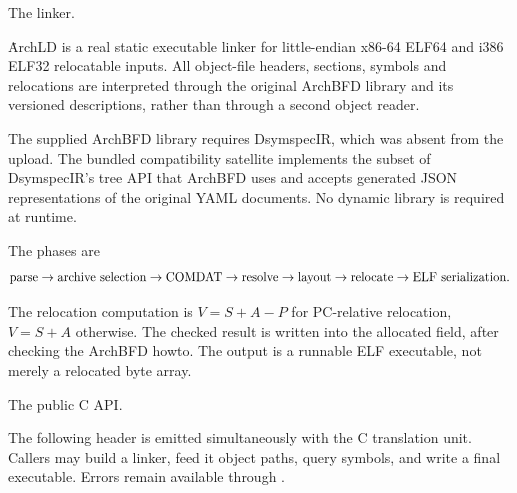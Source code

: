 
\def\title{ArchLD: An ArchBFD-driven Static Linker}
\def\contentsname{Contents}


The linker.

\.{ArchLD} is a real static executable linker for little-endian x86-64
ELF64 and i386 ELF32 relocatable inputs. All object-file headers,
sections, symbols and relocations are interpreted through the original
ArchBFD library and its versioned descriptions, rather than through a
second object reader.

The supplied ArchBFD library requires DsymspecIR, which was absent from
the upload. The bundled compatibility satellite implements the subset of
DsymspecIR's tree API that ArchBFD uses and accepts generated JSON
representations of the original YAML documents. No dynamic library is
required at runtime.

The phases are
$$\hbox{parse}\to\hbox{archive selection}\to\hbox{COMDAT}
\to\hbox{resolve}\to\hbox{layout}\to\hbox{relocate}
\to\hbox{ELF serialization}.$$

The relocation computation is $V=S+A-P$ for PC-relative relocation,
$V=S+A$ otherwise. The checked result is written into the allocated
field, after checking the ArchBFD howto. The output is a runnable ELF
executable, not merely a relocated byte array.

\fi

The public C API.

The following header is emitted simultaneously with the C translation
unit. Callers may build a linker, feed it object paths, query symbols,
and write a final executable. Errors remain available through
.

